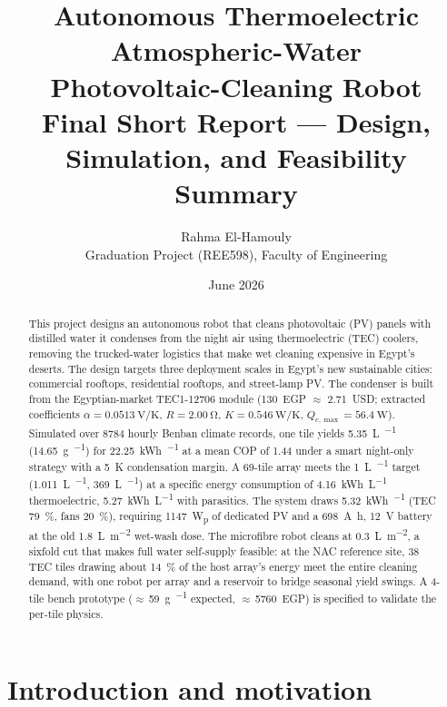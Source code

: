 \documentclass[11pt,a4paper]{article}
\title{\bfseries Autonomous Thermoelectric Atmospheric-Water\\
Photovoltaic-Cleaning Robot\\[0.4em]
\large Final Short Report --- Design, Simulation, and Feasibility Summary}
\author{Rahma El-Hamouly\\ \small Graduation Project (REE598), Faculty of Engineering}
\date{June 2026}
\newcommand{\Wp}{W\textsubscript{p}}
\begin{document}
\maketitle

\begin{abstract}
\noindent
This project designs an autonomous robot that cleans photovoltaic (PV)
panels with distilled water it condenses from the night air using
thermoelectric (TEC) coolers, removing the trucked-water logistics that
make wet cleaning expensive in Egypt's deserts. The design targets three
deployment scales in Egypt's new sustainable cities: commercial rooftops,
residential rooftops, and street-lamp PV. The condenser is built from the
Egyptian-market TEC1-12706 module (\num{130}~EGP $\approx$ \num{2.71}~USD;
extracted coefficients $\alpha=\SI{0.0513}{\volt\per\kelvin}$,
$R=\SI{2.00}{\ohm}$, $K=\SI{0.546}{\watt\per\kelvin}$,
$Q_{c,\max}=\SI{56.4}{\watt}$). Simulated over \num{8784} hourly Benban
climate records, one tile yields \SI{5.35}{\liter\per\year}
(\SI{14.65}{\gram\per\dy}) for \SI{22.25}{\kWh\per\year} at a mean COP of
\num{1.44} under a smart night-only strategy with a \SI{5}{\kelvin}
condensation margin. A 69-tile array meets the \SI{1}{\liter\per\dy}
target (\SI{1.011}{\liter\per\dy}, \SI{369}{\liter\per\year}) at a
specific energy consumption of \SI{4.16}{\kWh\per\liter} thermoelectric,
\SI{5.27}{\kWh\per\liter} with parasitics. The system draws
\SI{5.32}{\kWh\per\dy} (TEC \SI{79}{\percent}, fans \SI{20}{\percent}),
requiring \num{1147}~\Wp{} of dedicated PV and a
\SI{698}{\ampere\hour}, \SI{12}{\volt} battery at the old
\SI{1.8}{\liter\per\square\meter} wet-wash dose. The microfibre robot cleans at
\SI{0.3}{\liter\per\square\meter}, a sixfold cut that makes full water self-supply
feasible: at the NAC reference site, 38 TEC tiles drawing about
\SI{14}{\percent} of the host array's energy meet the entire cleaning
demand, with one robot per array and a reservoir to bridge seasonal yield
swings. A 4-tile bench prototype
($\approx$\,\SI{59}{\gram\per\dy} expected, $\approx$\,\num{5760}~EGP) is
specified to validate the per-tile physics.
\end{abstract}

\section{Introduction and motivation}
\label{sec:intro}
\end{document}
